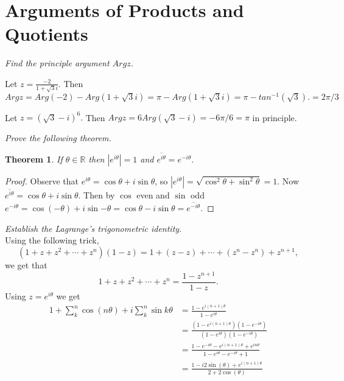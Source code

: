 \documentclass[letter]{article}
\newtheorem{theorem}{Theorem}
\newenvironment{menumerate}{%
  \edef\backupindent{\the\parindent}%
  \enumerate%
  \setlength{\parindent}{\backupindent}%
}{\endenumerate}
\begin{document}
\setcounter{section}{8}
\section{Arguments of Products and Quotients}
\begin{menumerate}
	\item \emph{Find the principle argument $Arg z$.}
	\begin{menumerate}
		\item Let $z = \frac{-2}{1 + \sqrt{3}i}.$ Then $Arg z = Arg(-2) - Arg(1 + \sqrt{3}i) = \pi -Arg(1 + \sqrt{3}i) = \pi - tan^{-1}(\sqrt{3}). = 2\pi/3$
		\item Let $z = \left(\sqrt{3} - i\right)^6.$ Then $Arg z = 6Arg(\sqrt{3} - i) = -6\pi/6 = \pi$ in principle.
	\end{menumerate}
	\item\emph{Prove the following theorem.}
	\begin{theorem}
		If $\theta \in \mathbb{R}$ then $|e^{i\theta}|=1$ and $\overline{e^{i\theta}} = e^{-i\theta}.$
	\end{theorem}
	\begin{proof}
		Observe that $e^{i\theta} = \cos \theta + i\sin \theta$, so $|e^{i\theta}| = \sqrt{\cos^2 \theta + \sin^2{\theta}}  = 1.$ Now $\overline{e^{i\theta}} = \cos \theta +i \sin \theta$. Then by $\cos$ even and $\sin$ odd $e^{-i \theta} = \cos(-\theta) + i\sin{-\theta} = \cos{\theta} - i\sin \theta = \overline{e^{-i\theta}}.$
	\end{proof}

	\setcounter{enumi}{8}
	\item \emph{Establish the Lagrange's trigonometric identity.} \\
	Using the following trick,
	\begin{equation}
		(1 + z + z^2 +\cdots + z^n)(1-z) = 1 + (z-z) + \cdots + (z^n - z^n) + z^{n+1},
	\end{equation}
	we get that
	\begin{equation}
		1 + z + z^2 +\cdots + z^n = \frac{1-z^{n+1}}{1-z}.
	\end{equation}
	Using $z = e^{i\theta}$ we get
	\begin{equation}
		\begin{aligned}
			1 + \sum_k^n \cos(n\theta)+ i\sum_k^n \sin k\theta &= \frac{1 - e^{i({n+1})\theta}}{1 - e^{i\theta}} \\
			&= \frac{(1 - e^{i({n+1})\theta})(1 - e^{-i\theta})}{(1 - e^{i\theta})(1 - e^{-i\theta})} \\
			&= \frac{1 -e^{-i\theta} -  e^{i({n+1})\theta} + e^{in\theta}}{1 -e^{i\theta}-e^{-i\theta} + 1} \\
			&= \frac{1 -i2\sin(\theta)+  e^{i({n+1})\theta}}{2 + 2\cos(\theta)}
		\end{aligned}
	\end{equation}


\end{menumerate}
\end{document}

